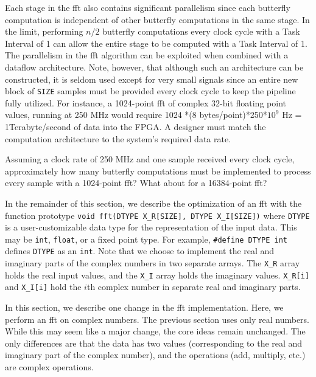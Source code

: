Each stage in the \gls{fft} also contains significant parallelism since each butterfly computation is independent of other butterfly computations in the same stage.  In the limit, performing $n/2$ butterfly computations every clock cycle with a Task Interval of 1 can allow the entire stage to be computed with a Task Interval of 1.  The parallelism in the \gls{fft} algorithm can be exploited when combined with a dataflow architecture.  Note, however, that although such an architecture can be constructed, it is seldom used except for very small signals since an entire new block of \lstinline|SIZE| samples must be provided every clock cycle to keep the pipeline fully utilized.  For instance, a 1024-point \gls{fft} of complex 32-bit floating point values, running at 250 MHz would require 1024 *(8 {bytes}/{point})*250*$10^9$ Hz = 1Terabyte/second of data into the FPGA.   A designer must match the computation architecture to the system's required data rate.

\begin{exercise}
Assuming a clock rate of 250 MHz and one sample received every clock cycle, approximately how many butterfly computations must be implemented to process every sample with a 1024-point \gls{fft}?  What about for a 16384-point \gls{fft}?
\end{exercise}

In the remainder of this section, we describe the optimization of an \gls{fft} with the function prototype \lstinline|void fft(DTYPE X_R[SIZE], DTYPE X_I[SIZE])| where \lstinline|DTYPE| is a user-customizable data type for the representation of the input data. This may be \lstinline|int|, \lstinline|float|, or a fixed point type. For example, \lstinline|#define DTYPE int| defines \lstinline|DTYPE| as an \lstinline|int|. Note that we choose to implement the real and imaginary parts of the complex numbers in two separate arrays. The \lstinline|X_R| array holds the real input values, and the \lstinline|X_I| array holds the imaginary values. \lstinline|X_R[i]| and \lstinline|X_I[i]| hold the $i$th complex number in separate real and imaginary parts. 

\begin{aside}
In this section, we describe one change in the \gls{fft} implementation. Here, we perform an \gls{fft} on complex numbers. The previous section uses only real numbers. While this may seem like a major change, the core ideas remain unchanged. The only differences are that the data has two values (corresponding to the real and imaginary part of the complex number), and the operations (add, multiply, etc.) are complex operations. 
\end{aside}

